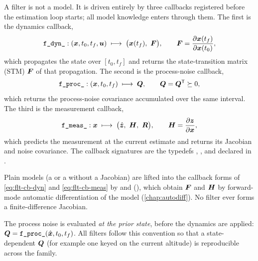 A filter is not a model. It is driven entirely by three callbacks registered
before the estimation loop starts; all model knowledge enters through them. The
first is the dynamics callback,
\begin{equation}
  \label{eq:flt-cb-dyn}
  \texttt{f\_dyn\_} : (\bm{x}, t_0, t_f, \bm{u}) \;\longmapsto\;
  \bigl(\bm{x}(t_f),\ \bm{F}\bigr),
  \qquad
  \bm{F} = \frac{\partial \bm{x}(t_f)}{\partial \bm{x}(t_0)} ,
\end{equation}
which propagates the state over $[t_0, t_f]$ and returns the state-transition
matrix (STM) $\bm{F}$ of that propagation. The second is the process-noise
callback,
\begin{equation}
  \label{eq:flt-cb-proc}
  \texttt{f\_proc\_} : (\bm{x}, t_0, t_f) \;\longmapsto\; \bm{Q},
  \qquad
  \bm{Q} = \bm{Q}^{\mathsf{T}} \succeq 0 ,
\end{equation}
which returns the process-noise covariance accumulated over the same interval.
The third is the measurement callback,
\begin{equation}
  \label{eq:flt-cb-meas}
  \texttt{f\_meas\_} : \bm{x} \;\longmapsto\;
  \bigl(\hat{\bm{z}},\ \bm{H},\ \bm{R}\bigr),
  \qquad
  \bm{H} = \frac{\partial \bm{z}}{\partial \bm{x}} ,
\end{equation}
which predicts the measurement at the current estimate and returns its Jacobian
and noise covariance. The callback signatures are the typedefs
, , and
 declared in .

Plain models (a  or a  without a
Jacobian) are lifted into the callback forms of \cref{eq:flt-cb-dyn} and
\cref{eq:flt-cb-meas} by  and
(), which obtain $\bm{F}$ and
$\bm{H}$ by forward-mode automatic differentiation of the model
(\cref{chap:autodiff}). No filter ever forms a finite-difference Jacobian.

\begin{lupntnote}
The process noise is evaluated \emph{at the prior state}, before the dynamics
are applied: $\bm{Q} = \texttt{f\_proc\_}(\hat{\bm{x}}, t_0, t_f)$. All
filters follow this convention so that a state-dependent $\bm{Q}$ (for example
one keyed on the current altitude) is reproducible across the family.
\end{lupntnote}

